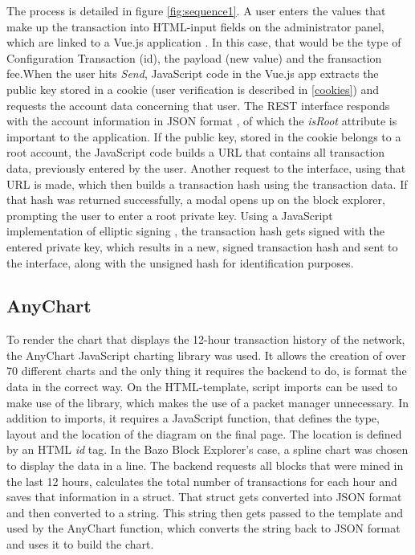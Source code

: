 The process is detailed in figure \ref{fig:sequence1}. A user enters the values that make up the transaction into HTML-input fields on the administrator panel, which are linked to a Vue.js application \cite{vue} . In this case, that would be the type of Configuration Transaction (id), the payload (new value) and the fransaction fee.When the user hits \emph{Send}, JavaScript code in the Vue.js app extracts the public key stored in a cookie \cite{vcookies} (user verification is described in \ref{cookies}) and requests the account data concerning that user. The REST interface responds with the account information in JSON format \cite{json} , of which the \emph{isRoot} attribute is important to the application. If the public key, stored in the cookie belongs to a root account, the JavaScript code builds a URL that contains all transaction data, previously entered by the user. Another request to the interface, using that URL is made, which then builds a transaction hash using the transaction data. If that hash was returned successfully, a modal opens up on the block explorer, prompting the user to enter a root private key. Using a JavaScript implementation of elliptic signing \cite{elliptic}, the transaction hash gets signed with the entered private key, which results in a new, signed transaction hash and sent to the interface, along with the unsigned hash for identification purposes.

\subsection{AnyChart} \label{chart}
To render the chart that displays the 12-hour transaction history of the network, the AnyChart JavaScript charting library \cite{anychart} was used. It allows the creation of over 70 different charts and the only thing it requires the backend to do, is format the data in the correct way. On the HTML-template, script imports can be used to make use of the library, which makes the use of a packet manager unnecessary. In addition to imports, it requires a JavaScript function, that defines the type, layout and the location of the diagram on the final page. The location is defined by an HTML \emph{id} tag. In the Bazo Block Explorer's case, a spline chart was chosen to display the data in a line.
The backend requests all blocks that were mined in the last 12 hours, calculates the total number of transactions for each hour and saves that information in a struct. That struct gets converted into JSON format and then converted to a string. This string then gets passed to the template and used by the AnyChart function, which converts the string back to JSON format and uses it to build the chart.

